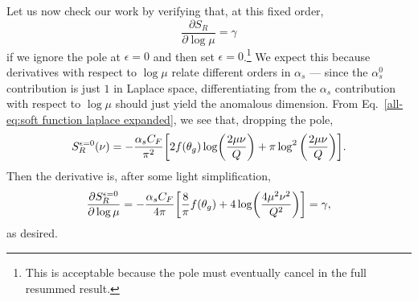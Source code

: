 \documentclass[../thesis.tex]{subfiles}
\begin{document}
	Let us now check our work by verifying that, at this fixed order,
	\begin{equation}
		\frac{\partial S_R}{\partial \log \mu} = \gamma
	\end{equation}
	if we ignore the pole at $\epsilon = 0$ and then set $\epsilon = 0$.\footnote{This is acceptable because the pole must eventually cancel in the full resummed result.} We expect this because derivatives with respect to $\log \mu$ relate different orders in $\alpha_s$ --- since the $\alpha_s^0$ contribution is just $1$ in Laplace space, differentiating from the $\alpha_s$ contribution with respect to $\log \mu$ should just yield the anomalous dimension. From Eq.~\ref{all-eq:soft function laplace expanded}, we see that, dropping the pole,
	\begin{equation}
		S_R^{\epsilon=0}(\nu) = -\frac{\alpha_s C_F}{\pi^2} \qty[2f(\theta_g)\log(\frac{2\mu\nu}{Q}) + \pi\log^2\qty(\frac{2\mu\nu}{Q})].
	\end{equation}
	Then the derivative is, after some light simplification,
	\begin{equation}
		\frac{\partial S_R^{\epsilon=0}}{\partial \log \mu} = -\frac{\alpha_s C_F}{4\pi}\qty[\frac{8}{\pi}f(\theta_g) + 4\log(\frac{4\mu^2\nu^2}{Q^2})] = \gamma,
	\end{equation}
	as desired.
\end{document}
